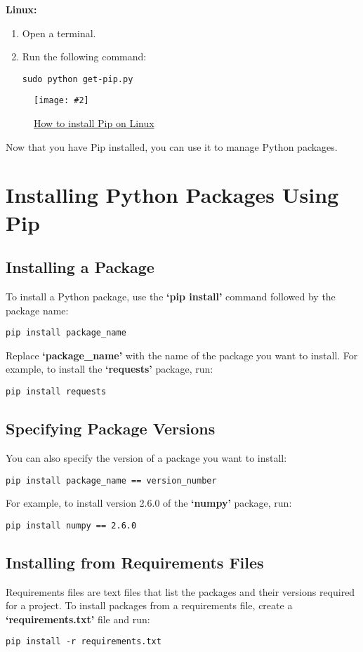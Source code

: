 \documentclass[a4paper, 12pt]{report}
\newcommand{\commandbox}[1]{%
    \begin{tcolorbox}[colback=green!10, colframe=green!50!black, rounded corners]
        #1
    \end{tcolorbox}%
}
\newcommand{\addimage}[4][]{%
    \begin{figure}[ht]
        \centering
        \texttt{[image: \#2]}
        \caption{#3}
        \label{#4}
    \end{figure}%
}
\begin{document}
        \textbf{Linux:}
            \begin{enumerate}
                \item Open a terminal.
                \item Run the following command:
                \commandbox{\texttt{sudo python get-pip.py}}
            \end{enumerate}

        \addimage[width=0.8\textwidth]{getPipLinux.jpg}{\href{https://linuxhint.com/wp-content/uploads/2020/09/word-image-619-768x358.png}{How to install Pip on Linux}}{fig:Linux get-pip}

        Now that you have Pip installed, you can use it to manage Python packages.


    \newpage
    
    
    \section{Installing Python Packages Using Pip}
    
        \subsection{Installing a Package}
        
            To install a Python package, use the \textbf{`pip install'} command followed by the package name:
            \commandbox{\texttt{pip install package\_name}}

            Replace \textbf{`package\_name'} with the name of the package you want to install. For example, to install the \textbf{`requests'} package, run:
            \commandbox{\texttt{pip install requests}}
    
        \subsection{Specifying Package Versions}
        
            You can also specify the version of a package you want to install:
            \commandbox{\texttt{pip install package\_name == version\_number}}

            For example, to install version 2.6.0 of the \textbf{`numpy'} package, run:
            \commandbox{\texttt{pip install numpy == 2.6.0}}


        \subsection{Installing from Requirements Files}
            Requirements files are text files that list the packages and their versions required for a project. To install packages from a requirements file, create a \textbf{`requirements.txt'} file and run:
            \commandbox{\texttt{pip install -r requirements.txt}}
            
\end{document}
